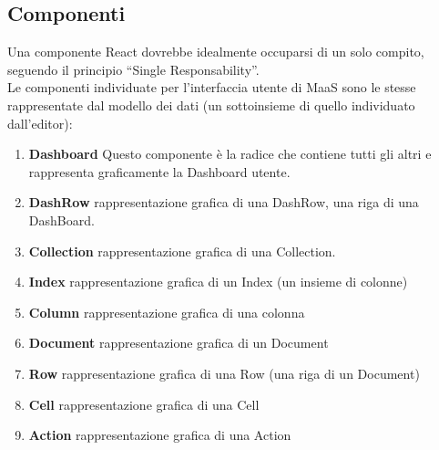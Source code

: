 \subsection{Componenti}
Una componente React dovrebbe idealmente occuparsi di un solo compito, seguendo il principio ``Single Responsability''.\\
Le componenti individuate per l'interfaccia utente di MaaS sono le stesse rappresentate dal modello dei dati (un sottoinsieme di quello individuato dall'editor):
\begin{enumerate}
\item{\textbf{Dashboard}}
  Questo componente è la radice che contiene tutti gli altri e rappresenta graficamente la Dashboard utente.
\item{\textbf{DashRow}}  rappresentazione grafica di una DashRow, una riga di una DashBoard.
\item{\textbf{Collection}}  rappresentazione grafica di una Collection.
\item{\textbf{Index}}  rappresentazione grafica di un Index (un insieme di colonne)
\item{\textbf{Column}}  rappresentazione grafica di una colonna
\item{\textbf{Document}} rappresentazione grafica di un Document
\item{\textbf{Row}}  rappresentazione grafica di una Row (una riga di un Document)
\item{\textbf{Cell}}  rappresentazione grafica di una Cell
\item{\textbf{Action}}  rappresentazione grafica di una Action
\end{enumerate}
